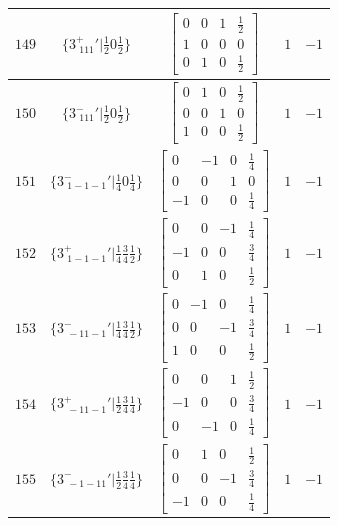 \documentclass[fleqn,8pt]{jsarticle}
\begin{document}
\begin{longtable}{ccccc}
$ 149 $ & $ \{3^{+}_{\,\,111}{}'|\frac{1}{2} 0 \frac{1}{2}\} $ & $ \begin{bmatrix} 0 & 0 & 1 & \frac{1}{2} \\ 1 & 0 & 0 & 0 \\ 0 & 1 & 0 & \frac{1}{2} \end{bmatrix} $ & $ 1 $ & $ -1 $ \\ \hline
$ 150 $ & $ \{3^{-}_{\,\,111}{}'|\frac{1}{2} 0 \frac{1}{2}\} $ & $ \begin{bmatrix} 0 & 1 & 0 & \frac{1}{2} \\ 0 & 0 & 1 & 0 \\ 1 & 0 & 0 & \frac{1}{2} \end{bmatrix} $ & $ 1 $ & $ -1 $ \\ \hline
$ 151 $ & $ \{3^{-}_{\,\,1-1-1}{}'|\frac{1}{4} 0 \frac{1}{4}\} $ & $ \begin{bmatrix} 0 & -1 & 0 & \frac{1}{4} \\ 0 & 0 & 1 & 0 \\ -1 & 0 & 0 & \frac{1}{4} \end{bmatrix} $ & $ 1 $ & $ -1 $ \\ \hline
$ 152 $ & $ \{3^{+}_{\,\,1-1-1}{}'|\frac{1}{4} \frac{3}{4} \frac{1}{2}\} $ & $ \begin{bmatrix} 0 & 0 & -1 & \frac{1}{4} \\ -1 & 0 & 0 & \frac{3}{4} \\ 0 & 1 & 0 & \frac{1}{2} \end{bmatrix} $ & $ 1 $ & $ -1 $ \\ \hline
$ 153 $ & $ \{3^{-}_{\,\,-11-1}{}'|\frac{1}{4} \frac{3}{4} \frac{1}{2}\} $ & $ \begin{bmatrix} 0 & -1 & 0 & \frac{1}{4} \\ 0 & 0 & -1 & \frac{3}{4} \\ 1 & 0 & 0 & \frac{1}{2} \end{bmatrix} $ & $ 1 $ & $ -1 $ \\ \hline
$ 154 $ & $ \{3^{+}_{\,\,-11-1}{}'|\frac{1}{2} \frac{3}{4} \frac{1}{4}\} $ & $ \begin{bmatrix} 0 & 0 & 1 & \frac{1}{2} \\ -1 & 0 & 0 & \frac{3}{4} \\ 0 & -1 & 0 & \frac{1}{4} \end{bmatrix} $ & $ 1 $ & $ -1 $ \\ \hline
$ 155 $ & $ \{3^{-}_{\,\,-1-11}{}'|\frac{1}{2} \frac{3}{4} \frac{1}{4}\} $ & $ \begin{bmatrix} 0 & 1 & 0 & \frac{1}{2} \\ 0 & 0 & -1 & \frac{3}{4} \\ -1 & 0 & 0 & \frac{1}{4} \end{bmatrix} $ & $ 1 $ & $ -1 $ \\ \hline

\end{longtable}
\end{document}

